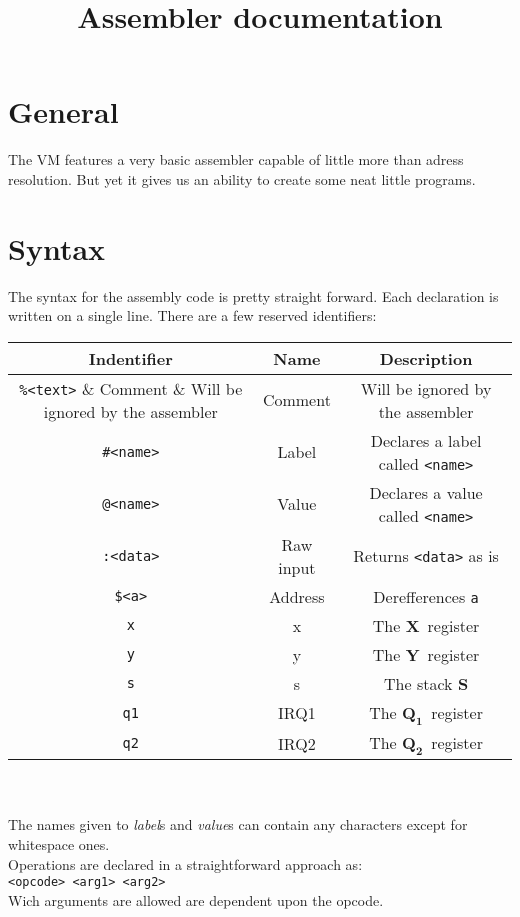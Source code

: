 \documentclass{article}
\newcommand{\V}{\verb}
\newcommand{\x}{$\textbf{X}$}
\newcommand{\y}{$\textbf{Y}$}
\newcommand{\s}{$\textbf{S}$}
\newcommand{\q}{$\textbf{Q}_{\textbf{1}}$}
\newcommand{\qq}{$\textbf{Q}_{\textbf{2}}$}
\begin{document}
\title{Assembler documentation}

\section{General}
The VM features a very basic assembler capable of little more than adress
resolution. But yet it gives us an ability to create some neat little programs.
\section{Syntax}
The syntax for the assembly code is pretty straight forward. Each declaration is
written on a single line. There are a few reserved identifiers:

\begin{tabular}{|c | c| c |}
\hline
Indentifier & Name & Description\\
\hline
\V+%
\hline
\V+#<name>+ & Label & Declares a label called \V+<name>+ \\
\hline
\V+@<name>+ & Value & Declares a value called \V+<name>+\\
\hline
\V+:<data>+ & Raw input & Returns \V+<data>+ as is \\
\hline
\verb+$<a>+ & Address & Derefferences \V+a+\\
\hline
\V+x+ & x & The \x \ register \\
\hline
\V+y+ & y & The \y \ register \\
\hline
\V+s+ & s & The stack \s \\
\hline
\V+q1+ & IRQ1 & The \q \ register\\
\hline
\V+q2+ & IRQ2 & The \qq \ register\\
\hline
\end{tabular}
\\
\\
The names given to \emph{label}s and \emph{value}s can contain any characters except for
whitespace ones.\\
Operations are declared in a straightforward approach as:\\
\V+<opcode> <arg1> <arg2>+ \\
Wich arguments are allowed are dependent upon the opcode.\\
\end{document}
